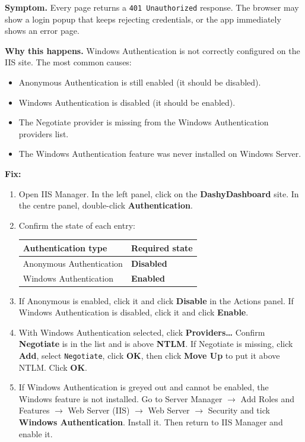 \documentclass[a4paper,11pt]{article}
\begin{document}
\textbf{Symptom.}
Every page returns a \texttt{401 Unauthorized} response.
The browser may show a login popup that keeps rejecting credentials,
or the app immediately shows an error page.

\textbf{Why this happens.}
Windows Authentication is not correctly configured on the IIS site.
The most common causes:
\begin{itemize}
  \item Anonymous Authentication is still enabled (it should be disabled).
  \item Windows Authentication is disabled (it should be enabled).
  \item The Negotiate provider is missing from the Windows Authentication providers list.
  \item The Windows Authentication feature was never installed on Windows Server.
\end{itemize}

\textbf{Fix:}

\begin{enumerate}
  \item Open IIS Manager.
        In the left panel, click on the \textbf{DashyDashboard} site.
        In the centre panel, double-click \textbf{Authentication}.
  \item Confirm the state of each entry:

\medskip
\begin{tabular}{@{}ll@{}}
\toprule
Authentication type & Required state \\
\midrule
Anonymous Authentication & \textbf{Disabled} \\
Windows Authentication   & \textbf{Enabled} \\
\bottomrule
\end{tabular}

\medskip
  \item If Anonymous is enabled, click it and click \textbf{Disable} in the Actions panel.
        If Windows Authentication is disabled, click it and click \textbf{Enable}.
  \item With Windows Authentication selected, click \textbf{Providers\ldots}
        Confirm \textbf{Negotiate} is in the list and is above \textbf{NTLM}.
        If Negotiate is missing, click \textbf{Add}, select \texttt{Negotiate},
        click \textbf{OK}, then click \textbf{Move Up} to put it above NTLM.
        Click \textbf{OK}.
  \item If Windows Authentication is greyed out and cannot be enabled, the Windows feature
        is not installed.
        Go to Server Manager $\rightarrow$ Add Roles and Features $\rightarrow$
        Web Server (IIS) $\rightarrow$ Web Server $\rightarrow$ Security
        and tick \textbf{Windows Authentication}. Install it.
        Then return to IIS Manager and enable it.
\end{enumerate}
\end{document}
